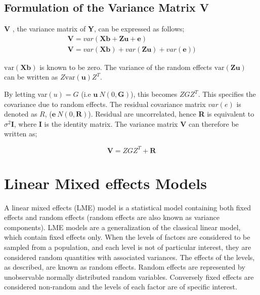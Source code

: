 \documentclass[12pt, a4paper]{report}
\theoremstyle{plain}
\theoremstyle{definition}
\theoremstyle{remark}
\begin{document}
\newpage
\subsection{Formulation of the Variance Matrix V}
\textbf{V} , the variance matrix of \textbf{Y}, can be expressed
as follows;
\begin{eqnarray}
\textbf{V}= var ( \textbf{Xb} + \textbf{Zu} + \textbf{e})\\
\textbf{V}= var ( \textbf{Xb} ) + var (\textbf{Zu}) +
var(\textbf{e}))
\end{eqnarray}

$\mbox{var}(\textbf{Xb})$ is known to be zero. The variance of the
random effects $\mbox{var}(\textbf{Zu})$ can be written as
$Z\mbox{var}(\textbf{u})Z^{T}$.

By letting var$(u) = G$ (i.e $\textbf{u} ~ N(0,\textbf{G})$), this
becomes $ZGZ^{T}$. This specifies the covariance due to random
effects. The residual covariance matrix $var(e)$ is denoted as
$R$, ($\textbf{e} ~ N(0,\textbf{R})$). Residual are uncorrelated,
hence \textbf{R} is equivalent to $\sigma^{2}$\textbf{I}, where
\textbf{I} is the identity matrix. The variance matrix \textbf{V}
can therefore be written as;

\begin{equation}
\textbf{V}  = ZGZ^{T} + \textbf{R}
\end{equation}





\section{Linear Mixed effects Models}
A linear mixed effects (LME) model is a statistical model containing both fixed effects and random effects (random effects are also known as variance components). LME models are a generalization of the classical linear model, which contain fixed effects only. When the levels of factors are considered to be sampled from a population,
and each level is not of particular interest, they are considered random quantities with associated variances.
The effects of the levels, as described, are known as random effects. Random effects are represented by unobservable
normally distributed random variables. Conversely fixed effects are considered non-random and the
levels of each factor are of specific interest.
\end{document}
